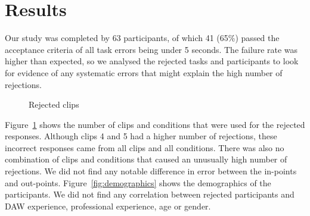 
\section{Results}\label{sec:vis-results}
Our study was completed by 63 participants, of which 41 (65\%) passed the acceptance criteria of all task errors being
under 5 seconds. The failure rate was higher than expected, so we analysed the rejected tasks and participants to look
for evidence of any systematic errors that might explain the high number of rejections.

\begin{figure}[h]
\centering
  \caption{Rejected clips}
  \label{fig:rejected-clips}
\end{figure}

Figure~\ref{fig:rejected-clips} shows the number of clips and conditions that were used for the rejected responses.
Although clips 4 and 5 had a higher number of rejections, these incorrect responses came from all clips and all
conditions. There was also no combination of clips and conditions that caused an unusually high number of rejections.
We did not find any notable difference in error between the in-points and out-points.  Figure~\ref{fig:demographics}
shows the demographics of the participants.  We did not find any correlation between rejected participants and DAW
experience, professional experience, age or gender.


